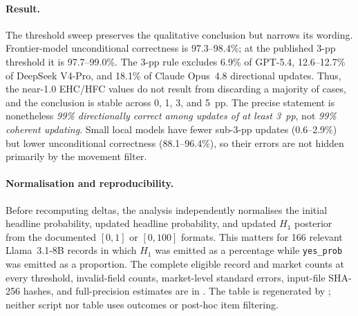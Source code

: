 \begin{center}
\begin{minipage}{\linewidth}
\centering
{}
\label{tab:exp1-threshold-robustness}
\scriptsize
\setlength{\tabcolsep}{4pt}
\resizebox{\linewidth}{!}{%

}
\end{minipage}
\end{center}

\paragraph{Result.}
The threshold sweep preserves the qualitative conclusion but narrows its
wording. Frontier-model unconditional correctness is 97.3--98.4\%; at the
published 3-pp threshold it is 97.7--99.0\%. The 3-pp rule excludes 6.9\% of
GPT-5.4, 12.6--12.7\% of DeepSeek V4-Pro, and 18.1\% of Claude Opus~4.8
directional updates. Thus, the near-1.0 EHC/HFC values do not result from
discarding a majority of cases, and the conclusion is stable across 0, 1, 3,
and 5~pp. The precise statement is nonetheless \emph{99\% directionally correct
among updates of at least 3~pp}, not \emph{99\% coherent updating}. Small local
models have fewer sub-3-pp updates (0.6--2.9\%) but lower unconditional
correctness (88.1--96.4\%), so their errors are not hidden primarily by the
movement filter.

\paragraph{Normalisation and reproducibility.}
Before recomputing deltas, the analysis independently normalises the initial
headline probability, updated headline probability, and updated $H_1$
posterior from the documented $[0,1]$ or $[0,100]$ formats. This matters for
166 relevant Llama~3.1-8B records in which $H_1$ was emitted as a percentage
while \texttt{yes\_prob} was emitted as a proportion. The complete eligible
record and market counts at every threshold, invalid-field counts, market-level
standard errors, input-file SHA-256 hashes, and full-precision estimates are in
. The table is
regenerated by
; neither script
nor table uses outcomes or post-hoc item filtering.

